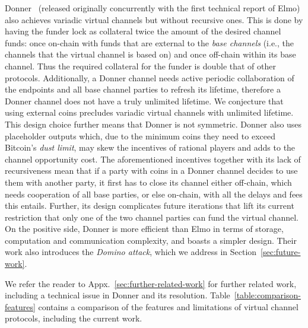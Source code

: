   Donner~\cite{donner}
    (released originally concurrently with the first technical report of Elmo) 
also achieves variadic
  virtual channels but without recursive ones. This is
  done by having the funder lock as
  collateral twice the amount of the desired channel funds: once on-chain with
  funds that are external to the \emph{base channels} (i.e., the channels that the
  virtual channel is based on) and once off-chain within its base channel. Thus
  the required collateral for the funder is double that of other protocols.
  Additionally, a Donner channel needs active periodic collaboration of the
  endpoints and all base channel parties to refresh
  its lifetime, therefore a Donner channel does not have a truly unlimited
  lifetime. We conjecture that using external coins precludes variadic
  virtual channels with unlimited lifetime. This
  design choice further means that Donner is not symmetric. Donner also uses
  placeholder outputs which, due to the minimum coins they need to
  exceed Bitcoin's \emph{dust limit}, may skew the incentives of rational players
  and adds to the channel
  opportunity cost. The aforementioned incentives
  together with its lack of recursiveness mean that if a party with coins in a
  Donner channel decides to use them with another party, it first has to close
  its channel either off-chain, which needs cooperation of all base parties, or
  else on-chain, with all the delays and fees this entails.
  Further, its design complicates
  future iterations that lift its current restriction that only one of the two
  channel parties can fund the virtual channel. On the positive side, Donner is
  more efficient than Elmo in terms of storage, computation and communication
  complexity, and boasts a simpler design. 
  Their work also introduces the \emph{Domino attack},
  which we address in Section~\ref{sec:future-work}.

  We refer the reader to Appx.~\ref{sec:further-related-work} for further
  related work, including a technical issue in Donner and its resolution.
  Table~\ref{table:comparison-features} contains a comparison of the
  features and limitations of virtual channel protocols, including the current
  work.
